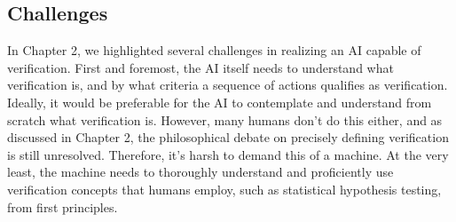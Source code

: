 





\subsection{Challenges}
In Chapter 2, we highlighted several challenges in realizing an AI capable of verification. First and foremost, the AI itself needs to understand what verification is, and by what criteria a sequence of actions qualifies as verification. Ideally, it would be preferable for the AI to contemplate and understand from scratch what verification is. However, many humans don't do this either, and as discussed in Chapter 2, the philosophical debate on precisely defining verification is still unresolved. Therefore, it's harsh to demand this of a machine. At the very least, the machine needs to thoroughly understand and proficiently use verification concepts that humans employ, such as statistical hypothesis testing, from first principles.


